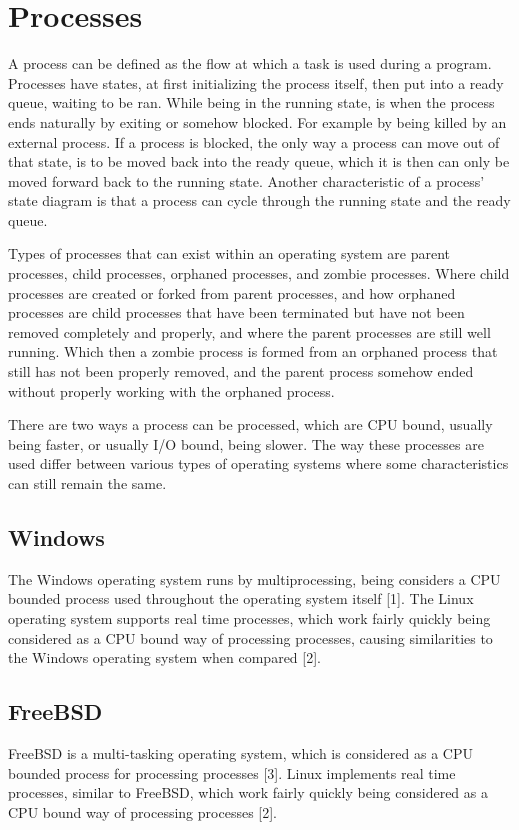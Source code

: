 \documentclass[letterpaper,10pt,onecolumn]{IEEEtran}
\begin{document}
\section*{Processes}
A process can be defined as the flow at which a task is used during a program. Processes have states, at first initializing the process itself, then put into a ready queue, waiting to be ran. While being in the running state, is when the process ends naturally by exiting or somehow blocked. For example by being killed by an external process. If a process is blocked, the only way a process can move out of that state, is to be moved back into the ready queue, which it is then can only be moved forward back to the running state. Another characteristic of a process' state diagram is that a process can cycle through the running state and the ready queue.
\par
Types of processes that can exist within an operating system are parent processes, child processes, orphaned processes, and zombie processes. Where child processes are created or forked from parent processes, and how orphaned processes are child processes that have been terminated but have not been removed completely and properly, and where the parent processes are still well running. Which then a zombie process is formed from an orphaned process that still has not been properly removed, and the parent process somehow ended without properly working with the orphaned process. 
\par
There are two ways a process can be processed, which are CPU bound, usually being faster, or usually I/O bound, being slower. 
The way these processes are used differ between various types of operating systems where some characteristics can still remain the same. 

	\subsection*{Windows}
	The Windows operating system runs by multiprocessing, being considers a CPU bounded process used throughout the operating system itself [1]. The Linux operating system supports real time processes, which work fairly quickly being considered as a CPU bound way of processing processes, causing similarities to the Windows operating system when compared [2].

	\subsection*{FreeBSD}
	FreeBSD is a multi-tasking operating system, which is considered as a CPU bounded process for processing processes [3]. Linux implements real time processes, similar to FreeBSD, which work fairly quickly being considered as a CPU bound way of processing processes [2].
\end{document}
